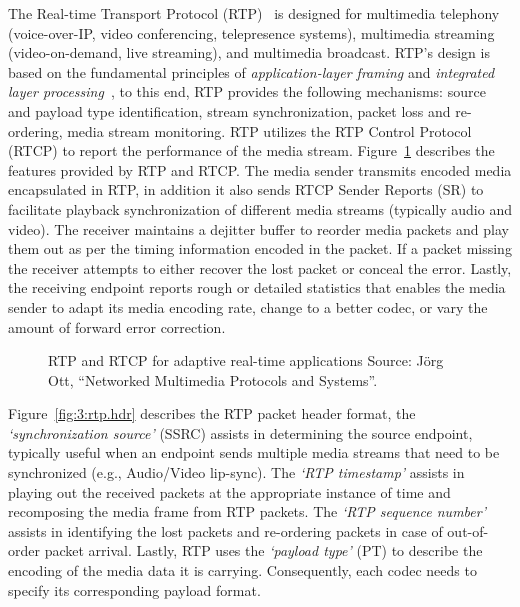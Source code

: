 
The Real-time Transport Protocol (RTP)~\cite{rfc3550} is designed for
multimedia telephony (voice-over-IP, video conferencing, telepresence
systems), multimedia streaming (video-on-demand, live streaming), and
multimedia broadcast. RTP's design is based on the fundamental principles of
\textit {application-layer framing} and \textit{integrated layer
processing}~\cite{clark:alf}, to this end, RTP provides the following
mechanisms: source and payload type identification, stream synchronization,
packet loss and re-ordering, media stream monitoring. RTP utilizes the RTP
Control Protocol (RTCP) to report the performance of the media stream.
Figure~\ref{fig:3:rtp:model} describes the features provided by RTP and RTCP.
The media sender transmits encoded media encapsulated in RTP, in addition it
also sends RTCP Sender Reports (SR) to facilitate playback synchronization of
different media streams (typically audio and video). The receiver maintains a
dejitter buffer to reorder media packets and play them out as per the timing
information encoded in the packet. If a packet missing the receiver attempts
to either recover the lost packet or conceal the error. Lastly, the receiving
endpoint reports rough or detailed statistics that enables the media sender to
adapt its media encoding rate, change to a better codec, or vary the amount of
forward error correction.

\begin{figure}[!h]
\caption{RTP and RTCP for adaptive real-time applications {\scriptsize Source:
J\"org Ott, ``Networked Multimedia Protocols and Systems''}.}
\label{fig:3:rtp:model}
\end{figure}

Figure~\ref{fig:3:rtp.hdr} describes the RTP packet header format, the
\textit{`synchronization source'} (SSRC) assists in determining the source
endpoint, typically useful when an endpoint sends multiple media streams that
need to be synchronized (e.g., Audio/Video lip-sync). The \textit{`RTP
timestamp'} assists in playing out the received packets at the appropriate
instance of time and recomposing the media frame from RTP packets. The
\textit{`RTP sequence number'} assists in identifying the lost packets and 
re-ordering packets in case of out-of-order packet arrival. Lastly, RTP uses
the \textit{`payload type'} (PT) to describe the encoding of the media data it is
carrying. Consequently, each codec needs to specify its corresponding payload
format.

